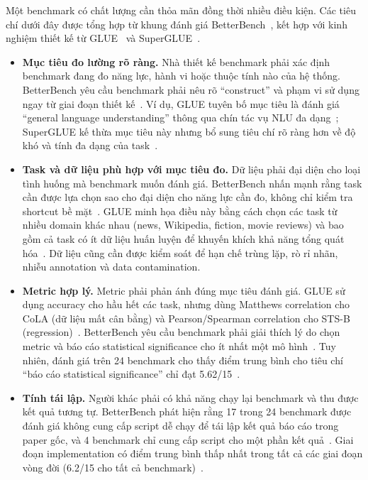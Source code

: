 Một benchmark có chất lượng cần thỏa mãn đồng thời nhiều điều kiện. Các tiêu chí dưới đây được tổng hợp từ khung đánh giá BetterBench~\cite{betterbench}, kết hợp với kinh nghiệm thiết kế từ GLUE~\cite{glue} và SuperGLUE~\cite{superglue}.

\begin{itemize}
    \item \textbf{Mục tiêu đo lường rõ ràng.} Nhà thiết kế benchmark phải xác định benchmark đang đo năng lực, hành vi hoặc thuộc tính nào của hệ thống. BetterBench yêu cầu benchmark phải nêu rõ ``construct'' và phạm vi sử dụng ngay từ giai đoạn thiết kế~\cite{betterbench}. Ví dụ, GLUE tuyên bố mục tiêu là đánh giá ``general language understanding'' thông qua chín tác vụ NLU đa dạng~\cite{glue}; SuperGLUE kế thừa mục tiêu này nhưng bổ sung tiêu chí rõ ràng hơn về độ khó và tính đa dạng của task~\cite{superglue}.

    \item \textbf{Task và dữ liệu phù hợp với mục tiêu đo.} Dữ liệu phải đại diện cho loại tình huống mà benchmark muốn đánh giá. BetterBench nhấn mạnh rằng task cần được lựa chọn sao cho đại diện cho năng lực cần đo, không chỉ kiểm tra shortcut bề mặt~\cite{betterbench}. GLUE minh họa điều này bằng cách chọn các task từ nhiều domain khác nhau (news, Wikipedia, fiction, movie reviews) và bao gồm cả task có ít dữ liệu huấn luyện để khuyến khích khả năng tổng quát hóa~\cite{glue}. Dữ liệu cũng cần được kiểm soát để hạn chế trùng lặp, rò rỉ nhãn, nhiễu annotation và data contamination.

    \item \textbf{Metric hợp lý.} Metric phải phản ánh đúng mục tiêu đánh giá. GLUE sử dụng accuracy cho hầu hết các task, nhưng dùng Matthews correlation cho CoLA (dữ liệu mất cân bằng) và Pearson/Spearman correlation cho STS-B (regression)~\cite{glue}. BetterBench yêu cầu benchmark phải giải thích lý do chọn metric và báo cáo statistical significance cho ít nhất một mô hình~\cite{betterbench}. Tuy nhiên, đánh giá trên 24 benchmark cho thấy điểm trung bình cho tiêu chí ``báo cáo statistical significance'' chỉ đạt 5.62/15~\cite{betterbench}.

    \item \textbf{Tính tái lập.} Người khác phải có khả năng chạy lại benchmark và thu được kết quả tương tự. BetterBench phát hiện rằng 17 trong 24 benchmark được đánh giá không cung cấp script dễ chạy để tái lập kết quả báo cáo trong paper gốc, và 4 benchmark chỉ cung cấp script cho một phần kết quả~\cite{betterbench}. Giai đoạn implementation có điểm trung bình thấp nhất trong tất cả các giai đoạn vòng đời (6.2/15 cho tất cả benchmark)~\cite{betterbench}.


\end{itemize}
